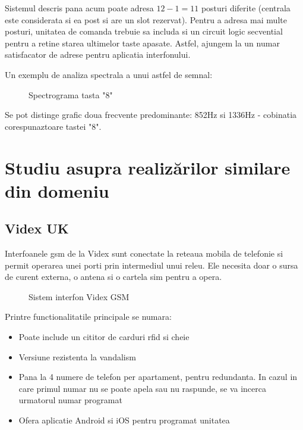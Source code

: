 Sistemul descris pana acum poate adresa $12-1=11$ posturi diferite (centrala este considerata si ea post si are un slot rezervat). Pentru a adresa mai multe posturi, unitatea de comanda trebuie sa includa si un circuit logic secvential pentru a retine starea ultimelor taste apasate. Astfel, ajungem la un numar satisfacator de adrese pentru aplicatia interfonului. 

Un exemplu de analiza spectrala a unui astfel de semnal:

\begin{figure}[h!]
  \centering
  \caption{Spectrograma tasta "8" \cite{AunsriNattapol2016}}
\end{figure}

Se pot distinge grafic doua frecvente predominante: 852Hz si 1336Hz - cobinatia corespunaztoare tastei "8".

\section {Studiu asupra realizărilor similare din domeniu}


\subsection {Videx UK}

Interfoanele \acrshort{gsm} de la Videx sunt conectate la reteaua mobila de telefonie si permit operarea unei porti prin intermediul unui releu. Ele necesita doar o sursa de curent externa, o antena si o cartela \acrfull{sim} pentru a opera.

\begin{figure}[h!]
  \centering
  \caption{Sistem interfon Videx GSM \cite{VidexUk}}
\end{figure}

Printre functionalitatile principale se numara:
\begin{itemize}
  \item Poate include un cititor de carduri \acrshort{rfid} si cheie
  \item Versiune rezistenta la vandalism
  \item Pana la 4 numere de telefon per apartament, pentru redundanta. In cazul in care primul numar nu se poate apela sau nu raspunde, se va incerca urmatorul numar programat
  \item Ofera aplicatie Android si iOS pentru programat unitatea
\end{itemize}

